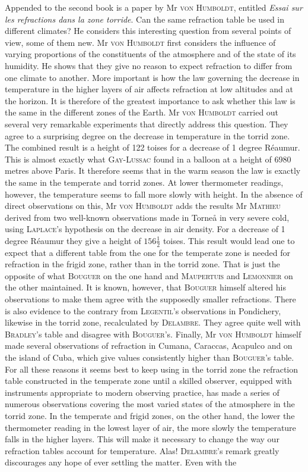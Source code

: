 Appended to the second book is a paper by Mr \textsc{von Humboldt}, entitled \emph{Essai sur les refractions dans la zone torride}. Can the same refraction table be used in different climates? He considers this interesting question from several points of view, some of them new. Mr \textsc{von Humboldt} first considers the influence of varying proportions of the constituents of the atmosphere and of the state of its humidity. He shows that they give no reason to expect refraction to differ from one climate to another. More important is how the law governing the decrease in temperature in the higher layers of air affects refraction at low altitudes and at the horizon. It is therefore of the greatest importance to ask whether this law is the same in the different zones of the Earth. Mr \textsc{von Humboldt} carried out several very remarkable experiments that directly address this question. They agree to a surprising degree on the decrease in temperature in the torrid zone. The combined result is a height of 122 toises for a decrease of 1 degree Réaumur. This is almost exactly what \textsc{Gay-Lussac} found in a balloon at a height of 6980 metres above Paris. It therefore seems that in the warm season the law is exactly the same in the temperate and torrid zones. At lower thermometer readings, however, the temperature seems to fall more slowly with height. In the absence of direct observations on this, Mr \textsc{von Humboldt} adds the results Mr \textsc{Mathieu} derived from two well-known observations made in Torneå in very severe cold, using \textsc{Laplace}’s hypothesis on the decrease in air density. For a decrease of 1 degree Réaumur they give a height of $156\frac{1}{2}$ toises. This result would lead one to expect that a different table from the one for the temperate zone is needed for refraction in the frigid zone, rather than in the torrid zone. That is just the opposite of what \textsc{Bouguer} on the one hand and \textsc{Maupertuis} and \textsc{Lemonnier} on the other maintained. It is known, however, that \textsc{Bouguer} himself altered his observations to make them agree with the supposedly smaller refractions. There is also evidence to the contrary from \textsc{Legentil}’s observations in Pondichery, likewise in the torrid zone, recalculated by \textsc{Delambre}. They agree quite well with \textsc{Bradley}’s table and disagree with \textsc{Bouguer}’s. Finally, Mr \textsc{von Humboldt} himself made several observations of refraction in Cumana, Caraccas, Acapulco and on the island of Cuba, which give values consistently higher than \textsc{Bouguer}’s table. For all these reasons it seems best to keep using in the torrid zone the refraction table constructed in the temperate zone until a skilled observer, equipped with instruments appropriate to modern observing practice, has made a series of numerous observations covering the most varied states of the atmosphere in the torrid zone. In the temperate and frigid zones, on the other hand, the lower the thermometer reading in the lowest layer of air, the more slowly the temperature falls in the higher layers. This will make it necessary to change the way our refraction tables account for temperature. Alas! \textsc{Delambre}’s remark greatly discourages any hope of ever settling the matter. Even with the 